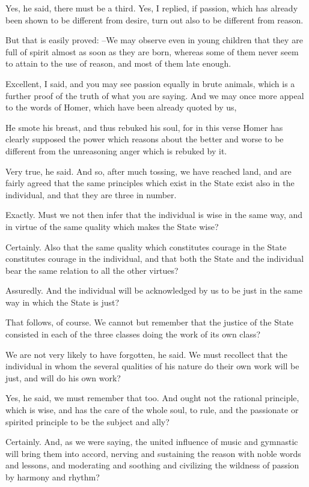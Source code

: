 Yes, he said, there must be a third.
Yes, I replied, if passion, which has already been shown to be different from desire, turn out also to be different from reason.

But that is easily proved: --We may observe even in young children that they are full of spirit almost as soon as they are born, whereas some of them never seem to attain to the use of reason, and most of them late enough.

Excellent, I said, and you may see passion equally in brute animals, which is a further proof of the truth of what you are saying. And we may once more appeal to the words of Homer, which have been already quoted by us,

He smote his breast, and thus rebuked his soul, for in this verse Homer has clearly supposed the power which reasons about the better and worse to be different from the unreasoning anger which is rebuked by it.

Very true, he said.
And so, after much tossing, we have reached land, and are fairly agreed that the same principles which exist in the State exist also in the individual, and that they are three in number.

Exactly.
Must we not then infer that the individual is wise in the same way, and in virtue of the same quality which makes the State wise?

Certainly.
Also that the same quality which constitutes courage in the State constitutes courage in the individual, and that both the State and the individual bear the same relation to all the other virtues?

Assuredly.
And the individual will be acknowledged by us to be just in the same way in which the State is just?

That follows, of course.
We cannot but remember that the justice of the State consisted in each of the three classes doing the work of its own class?

We are not very likely to have forgotten, he said.
We must recollect that the individual in whom the several qualities of his nature do their own work will be just, and will do his own work?

Yes, he said, we must remember that too.
And ought not the rational principle, which is wise, and has the care of the whole soul, to rule, and the passionate or spirited principle to be the subject and ally?

Certainly.
And, as we were saying, the united influence of music and gymnastic will bring them into accord, nerving and sustaining the reason with noble words and lessons, and moderating and soothing and civilizing the wildness of passion by harmony and rhythm?

